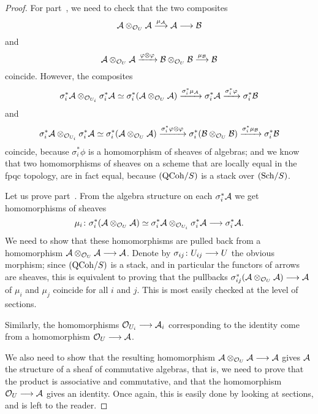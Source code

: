 \begin{4   STACKS}
\begin{4.2 Descent for quasi-coherent sheaves}
\begin{lemma}
\begin{enumeratei}
\end{enumeratei}
\end{lemma}

\begin{proof}
For part~, we need to check that the two composites
   \[
   \cA\otimes_{\cO_U} \cA
   \overset{\mu_{\cA}}\larr
   \cA
   \arr
   \cB
   \]
and
   \[
   \mathcal{A}\otimes_{\mathcal{O}_U} \mathcal{A}
   \xrightarrow{\varphi \otimes \varphi}
   \mathcal{B}\otimes_{\mathcal{O}_U} \mathcal{B}
   \overset{\mu_{\mathcal{B}}}{\longrightarrow}
   \mathcal{B}
   \]
coincide. However, the composites
   \[
   \sigma_i^*\mathcal{A} \otimes_{\mathcal{O}_{U_i}}
   \sigma_i^*\mathcal{A}
   \simeq
   \sigma_i^*(\mathcal{A}\otimes_{\mathcal{O}_U} \mathcal{A})
   \xrightarrow{\sigma_i^* \mu_{\mathcal{A}}}
   \sigma_i^*\mathcal{A}
   \xrightarrow{\sigma_i^* \varphi}
   \sigma_i^*\mathcal{B}
   \]
and 
   \[
   \sigma_i^*\mathcal{A} \otimes_{\mathcal{O}_{U_i}} \sigma_i^*\mathcal{A}
   \simeq
   \sigma_i^*(\mathcal{A}\otimes_{\mathcal{O}_U} \mathcal{A})
   \xrightarrow{\sigma_i^* \varphi\otimes\varphi}
   \sigma_i^*(\mathcal{B}\otimes_{\mathcal{O}_U} \mathcal{B})
   \xrightarrow{\sigma_i^* \mu_{\mathcal{B}}}
   \sigma_i^*\mathcal{B}   
   \]
coincide, because $\sigma_i^*\phi$ is a homomorphism of sheaves of algebras; and we know that two homomorphisms of \qc sheaves on a scheme that are locally equal in the fpqc topology, are in fact equal, because $({\mathrm{QCoh}/S})$ is a stack over $({\mathrm{Sch}/S})$.

Let us prove part~. From the algebra structure on each $\sigma_i^*\mathcal{A}$ we get homomorphisms of \qc sheaves
   \[
   \mu_i \colon \sigma_i^*(\cA \otimes_{\cO_U} \cA)
   \simeq
   \sigma_i^* \cA \otimes_{\cO_{U_i}} \sigma_i^*\cA
   \arr \sigma_i^*\cA.
   \]
We need to show that these homomorphisms are pulled back from a homomorphism $\cA \otimes_{\cO_U} \cA \arr \cA$. Denote by $\sigma_{ij} \colon U_{ij} \arr U$ the obvious morphism; since $({\mathrm{QCoh}/S})$ is a stack, and in particular the functors of arrows are sheaves, this is equivalent to proving that the pullbacks $\sigma_{ij}^*(\cA \otimes_{\cO_{U}} \cA) \arr \cA$ of $\mu_i$ and $\mu_j$ coincide for all $i$ and $j$. This is most easily checked at the level of sections.

Similarly, the homomorphisms $\cO_{U_{i}} \arr \cA_{i}$ corresponding to the identity come from a homomorphism $\cO_{U} \arr \cA$.

We also need to show that the resulting homomorphism $\cA \otimes_{\cO_U} \cA \arr \cA$ gives $\mathcal{A}$ the structure of a sheaf of commutative algebras, that is, we need to prove that the product is associative and commutative, and that the homomorphism $\cO_{U} \arr \cA$ gives an identity. Once again, this is easily done by looking at sections, and is left to the reader.
\end{proof}



\end{4.2 Descent for quasi-coherent sheaves}
\end{4   STACKS}
